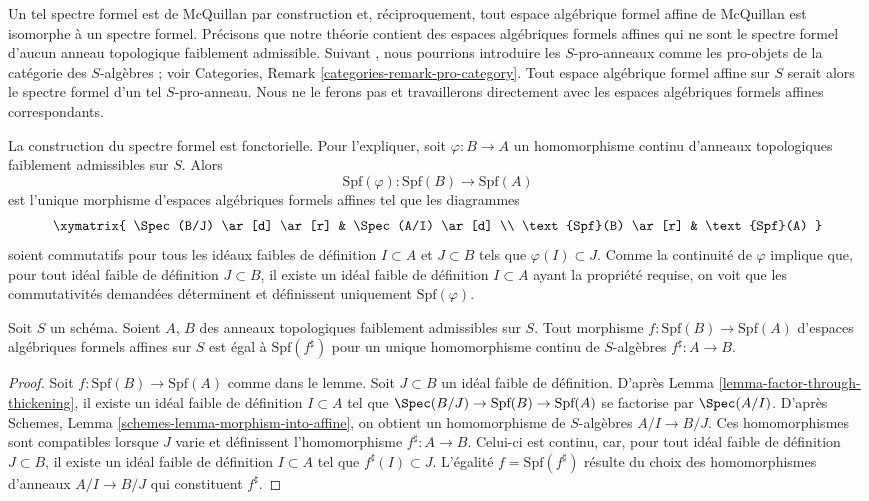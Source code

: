 \noindent
Un tel spectre formel est de McQuillan par construction et, réciproquement,
tout espace algébrique formel affine de McQuillan est isomorphe à un
spectre formel. Précisons que notre théorie contient des espaces algébriques
formels affines qui ne sont le spectre formel d'aucun
anneau topologique faiblement admissible.
Suivant \cite{Yasuda}, nous pourrions introduire les $S$-pro-anneaux
comme les pro-objets de la catégorie des $S$-algèbres ; voir Categories,
Remark \ref{categories-remark-pro-category}. Tout
espace algébrique formel affine sur $S$ serait alors le spectre formel d'un tel
$S$-pro-anneau. Nous ne le ferons pas et travaillerons directement avec les
espaces algébriques formels affines correspondants.

\medskip\noindent
La construction du spectre formel est fonctorielle. Pour l'expliquer,
soit $\varphi : B \to A$ un homomorphisme continu d'anneaux topologiques
faiblement admissibles sur $S$. Alors
$$
\text{Spf}(\varphi) : \text{Spf}(B) \to \text{Spf}(A)
$$
est l'unique morphisme d'espaces algébriques formels affines tel que
les diagrammes
$$
\xymatrix{
\Spec(B/J) \ar[d] \ar[r] & \Spec(A/I) \ar[d] \\
\text{Spf}(B) \ar[r] & \text{Spf}(A)
}
$$
soient commutatifs pour tous les idéaux faibles de définition $I \subset A$ et $J \subset B$
tels que $\varphi(I) \subset J$. Comme la continuité de $\varphi$
implique que, pour tout idéal faible de définition $J \subset B$,
il existe un idéal faible de définition $I \subset A$ ayant la propriété
requise, on voit que les commutativités demandées déterminent
et définissent uniquement $\text{Spf}(\varphi)$.

\begin{lemma}
\label{lemma-morphism-between-formal-spectra}
Soit $S$ un schéma. Soient $A$, $B$ des anneaux topologiques faiblement admissibles
sur $S$. Tout morphisme $f : \text{Spf}(B) \to \text{Spf}(A)$
d'espaces algébriques formels affines sur $S$
est égal à $\text{Spf}(f^\sharp)$ pour un unique homomorphisme continu
de $S$-algèbres $f^\sharp : A \to B$.
\end{lemma}

\begin{proof}
Soit $f : \text{Spf}(B) \to \text{Spf}(A)$ comme dans le lemme.
Soit $J \subset B$ un idéal faible de définition. D'après
Lemma \ref{lemma-factor-through-thickening},
il existe un idéal faible de définition $I \subset A$ tel que
$\Spec(B/J) \to \text{Spf}(B) \to \text{Spf}(A)$
se factorise par $\Spec(A/I)$. D'après
Schemes, Lemma \ref{schemes-lemma-morphism-into-affine},
on obtient un homomorphisme de $S$-algèbres $A/I \to B/J$.
Ces homomorphismes sont compatibles lorsque $J$ varie et définissent
l'homomorphisme $f^\sharp : A \to B$. Celui-ci est continu, car,
pour tout idéal faible de définition $J \subset B$, il existe un
idéal faible de définition $I \subset A$ tel que
$f^\sharp(I) \subset J$. L'égalité $f = \text{Spf}(f^\sharp)$
résulte du choix des homomorphismes d'anneaux $A/I \to B/J$ qui constituent $f^\sharp$.
\end{proof}

